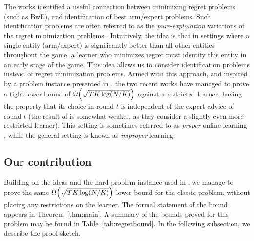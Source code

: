 \documentclass[a4paper,11pt]{article}
\theoremstyle{definition}
\begin{document}
The works \cite{mannor2004sample, chen2024interpolating} identified a useful connection between minimizing regret problems (such as BwE), and identification of best arm/expert problems. Such identification problems are often referred to as the \emph{pure-exploration} variations of the regret minimization problems \cite{even2002pac, mannor2004sample}. Intuitively, the idea is that in settings where a single entity (arm/expert) is significantly better than all other entities throughout the game, a learner who minimizes regret must identify this entity in an early stage of the game. This idea allows us to consider identification problems instead of regret minimization problems.
Armed with this approach, and inspired by a problem instance presented in \cite{chen2024interpolating}, the two recent works \cite{ito2024minimax, cesa2025improved} have managed to prove a tight lower bound of $\Omega \mleft(\sqrt{T K\log (N/K)} \mright)$ against a restricted learner, having the property that its choice in round $t$ is independent of the expert advice of round $t$ (the result of \cite{cesa2025improved} is somewhat weaker, as they consider a slightly even more restricted learner). This setting is sometimes referred to as \emph{proper} online learning \cite{hanneke2021online}, while the general setting is known as \emph{improper} learning.

\subsection{Our contribution}
Building on the ideas and the hard problem instance  used in \cite{ito2024minimax}, we manage to prove the same $\Omega \mleft(\sqrt{T K\log (N/K)} \mright)$ lower bound for the classic problem, without placing any restrictions on the learner. The formal statement of the bound appears in Theorem~\ref{thm:main}. A summary of the bounds proved for this problem may be found in Table~\ref{tab:regretbound}. In the following subsection, we describe the proof sketch.
\end{document}
